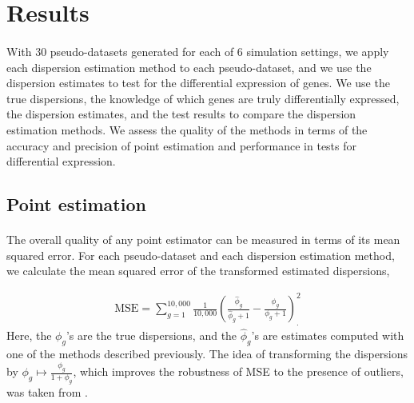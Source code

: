 \documentclass[10pt]{article}
\providecommand{\wh}[1]{\widehat{#1}}
\begin{document}
\section*{Results}

\paragraph{} \indent With 30 pseudo-datasets generated for each of 6 simulation settings, we apply each dispersion estimation method to each pseudo-dataset, and we use the dispersion estimates to test for the differential expression of genes. We use the true dispersions, the knowledge of which genes are truly differentially expressed, the dispersion estimates, and the test results to compare the dispersion estimation methods. We assess the quality of the methods in terms of the accuracy and precision of point estimation and performance in tests for differential expression.

\subsection*{Point estimation}


\paragraph{} \indent The overall quality of any point estimator can be measured in terms of its mean squared error. For each pseudo-dataset and each dispersion estimation method, we calculate the mean squared error of the transformed estimated dispersions,

\begin{align*}
\text{MSE} = \sum_{g = 1}^{10,000} \frac{1}{10,000} \left ( \frac{\wh{\phi}_g}{\wh{\phi}_g + 1} - \frac{\phi_g}{\phi_g + 1} \right )^2_. 
\end{align*} Here, the $\phi_g$'s are the true dispersions, and the $\wh{\phi}_g$'s are estimates computed with one of the methods described previously. The idea of transforming the dispersions by $\phi_g \mapsto\frac{\phi_g}{1+\phi_g}$, which improves the robustness of MSE to the presence of outliers, was taken from \cite{rs07}.
\end{document}
